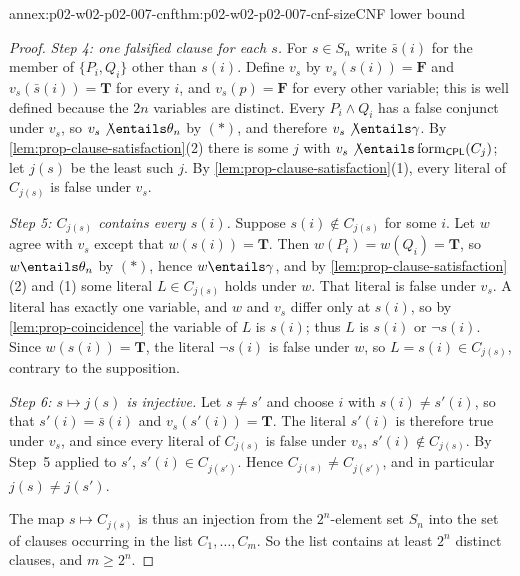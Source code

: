 \begin{annexitem}{annex:p02-w02-p02-007-cnf}{thm:p02-w02-p02-007-cnf-size}{CNF lower bound}
\begin{proof}
\emph{Step 4: one falsified clause for each \(s\).}  For \(s\in S_n\) write
\(\bar s(i)\) for the member of \(\{P_i,Q_i\}\) other than \(s(i)\).  Define
\(v_s\) by \(v_s(s(i))=\mathbf F\) and \(v_s(\bar s(i))=\mathbf T\) for
every \(i\), and \(v_s(p)=\mathbf F\) for every other variable; this is
well defined because the \(2n\) variables are distinct.  Every
\(P_i\land Q_i\) has a false conjunct under \(v_s\), so
\(v_s\not\entails\theta_n\) by \((\ast)\), and therefore
\(v_s\not\entails\gamma\).  By \cref{lem:prop-clause-satisfaction}(2) there
is some \(j\) with
\(v_s\not\entails\operatorname{form}_{\mathsf{CPL}}(C_j)\); let \(j(s)\) be
the least such \(j\).  By \cref{lem:prop-clause-satisfaction}(1), every
literal of \(C_{j(s)}\) is false under \(v_s\).

\emph{Step 5: \(C_{j(s)}\) contains every \(s(i)\).}  Suppose
\(s(i)\notin C_{j(s)}\) for some \(i\).  Let \(w\) agree with \(v_s\) except
that \(w(s(i))=\mathbf T\).  Then \(w(P_i)=w(Q_i)=\mathbf T\), so
\(w\entails\theta_n\) by \((\ast)\), hence \(w\entails\gamma\), and by
\cref{lem:prop-clause-satisfaction}(2) and (1) some literal \(L\in C_{j(s)}\)
holds under \(w\).  That literal is false under \(v_s\).  A literal has
exactly one variable, and \(w\) and \(v_s\) differ only at \(s(i)\), so by
\cref{lem:prop-coincidence} the variable of \(L\) is \(s(i)\); thus \(L\) is
\(s(i)\) or \(\neg s(i)\).  Since \(w(s(i))=\mathbf T\), the literal
\(\neg s(i)\) is false under \(w\), so \(L=s(i)\in C_{j(s)}\), contrary to
the supposition.

\emph{Step 6: \(s\mapsto j(s)\) is injective.}  Let \(s\neq s'\) and choose
\(i\) with \(s(i)\neq s'(i)\), so that \(s'(i)=\bar s(i)\) and
\(v_s(s'(i))=\mathbf T\).  The literal \(s'(i)\) is therefore true under
\(v_s\), and since every literal of \(C_{j(s)}\) is false under \(v_s\),
\(s'(i)\notin C_{j(s)}\).  By Step~5 applied to \(s'\),
\(s'(i)\in C_{j(s')}\).  Hence \(C_{j(s)}\neq C_{j(s')}\), and in particular
\(j(s)\neq j(s')\).

The map \(s\mapsto C_{j(s)}\) is thus an injection from the \(2^n\)-element
set \(S_n\) into the set of clauses occurring in the list
\(C_1,\ldots,C_m\).  So the list contains at least \(2^n\) distinct clauses,
and \(m\geq2^n\).
\end{proof}
\end{annexitem}
